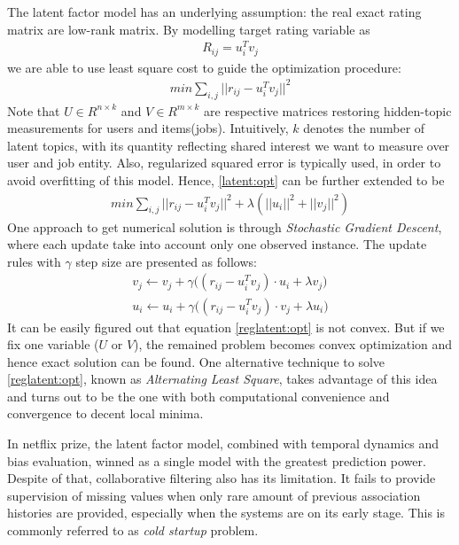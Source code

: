 \documentclass{article} %
\begin{document}
The latent factor model has an underlying assumption: the real exact rating matrix are
low-rank matrix. By modelling target rating variable as 
\begin{align}
    R_{ij} = u_i^T v_j 
\end{align}
we are able to use least square cost to guide the optimization procedure: 
\begin{align} \label{latent:opt}
    min \sum_{i,j} || r_{ij} - u_i^T v_j ||^2 
\end{align}
Note that $U \in R^{n\times k}$ and $V \in R^{m\times k}$ are respective matrices
restoring hidden-topic measurements for users and items(jobs). Intuitively,
$k$ denotes the number of latent topics, with its quantity reflecting shared
interest we want to measure over user and job entity. Also, regularized
squared error is typically used, in order to avoid overfitting of this model.
Hence, \ref{latent:opt} can be further extended to be 
\begin{align} \label{reglatent:opt}
    min \sum_{i,j} || r_{ij} - u_i^T v_j ||^2 + \lambda(||u_i||^2 + ||v_j||^2) 
\end{align}
One approach to get numerical solution is through {\it Stochastic Gradient
    Descent}, where each update take into account only one observed instance.
The update rules with $\gamma$ step size are presented as follows: 
\begin{align}
    v_j \leftarrow v_j + \gamma \big( (r_{ij}-u_i^T v_j)\cdot u_i + \lambda
    v_j \big) \\
    u_i \leftarrow u_i + \gamma \big( (r_{ij}-u_i^T v_j)\cdot v_j + \lambda
    u_i \big)
\end{align}
It can be easily figured out that equation \ref{reglatent:opt} is not convex.
But if we fix one variable ($U$ or $V$), the remained problem becomes convex
optimization and hence exact solution can be found. 
One alternative technique to solve \ref{reglatent:opt}, known as {\it Alternating
    Least Square}, takes advantage of this idea and turns out to be the one with
both computational convenience and convergence to decent local minima.

In netflix prize, the latent factor model, combined with temporal dynamics and
bias evaluation, winned as a single model with the greatest prediction power.
Despite of that, collaborative filtering also has its limitation. It fails to
provide supervision of missing values when only rare amount of previous
association histories are provided, especially when the systems are on its
early stage.  This is commonly referred to as {\it cold startup} problem.
\end{document}
